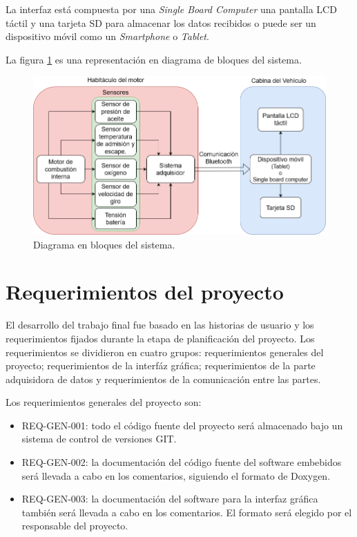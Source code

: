 La interfaz está compuesta por una \textit{Single Board Computer} una pantalla LCD táctil y una tarjeta SD para almacenar los datos recibidos o puede ser un dispositivo móvil como un \textit{Smartphone} o \textit{Tablet}.

La figura \ref{fig:diagrama-de-bloques} es una representación en diagrama de bloques del sistema.

\begin{figure}[htpb]
\centering
\includegraphics[width=.9\textwidth]{./Figures/diagrama-proyecto.png}
\caption{Diagrama en bloques del sistema.}
\label{fig:diagrama-de-bloques}
\end{figure}

\section{Requerimientos del proyecto}

El desarrollo del trabajo final fue basado en las historias de usuario y los requerimientos fijados durante la etapa de planificación del proyecto. Los requerimientos se dividieron en cuatro grupos: requerimientos generales del proyecto; requerimientos de la interfáz gráfica; requerimientos de la parte adquisidora de datos y requerimientos de la comunicación entre las partes.

Los requerimientos generales del proyecto son:
\begin{itemize}
\item REQ-GEN-001: todo el código fuente del proyecto será almacenado bajo un sistema de control de versiones GIT.
\item REQ-GEN-002: la documentación del código fuente del software embebidos será llevada a cabo en los comentarios, siguiendo el formato de Doxygen.
\item REQ-GEN-003: la documentación del software para la interfaz gráfica también será llevada a cabo en los comentarios. El formato será elegido por el responsable del proyecto.
\end{itemize}


